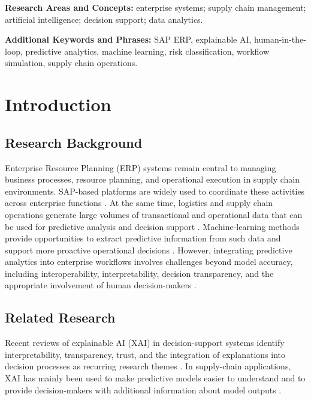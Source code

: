 \documentclass[10pt,a4paper]{article}
\begin{document}
\noindent\textbf{Research Areas and Concepts:}
enterprise systems; supply chain management; artificial intelligence; decision support; data analytics.

\medskip
\noindent\textbf{Additional Keywords and Phrases:}
SAP ERP, explainable AI, human-in-the-loop, predictive analytics, machine learning, risk classification, workflow simulation, supply chain operations.

\medskip

\section{Introduction}

\subsection{Research Background}

Enterprise Resource Planning (ERP) systems remain central to managing business processes, 
resource planning, and operational execution in supply chain environments. 
SAP-based platforms are widely used to coordinate these activities across enterprise 
functions \cite{monk2006sap}.
At the same time, logistics and supply chain operations generate large volumes of 
transactional and operational data that can be used for predictive analysis and 
decision support \cite{constante2019dataco}.
Machine-learning methods provide opportunities to 
extract predictive information from such data and support 
more proactive operational decisions
 \cite{xu2021industry40,olan2024xai_supplychain}.
However, integrating predictive analytics into 
enterprise workflows involves challenges beyond model accuracy, 
including interoperability, interpretability, 
decision transparency, and the appropriate involvement 
of human decision-makers \cite{amershi2019guidelines,li2024xai_supplychain}.

\subsection{Related Research}

Recent reviews of explainable AI (XAI) in decision-support systems
identify interpretability, transparency, trust, and the integration of
explanations into decision processes as recurring research themes
\cite{kostopoulos2024xai_dss,ezeji2024explainable_dss,fanfani2026human_dss}.
In supply-chain applications, XAI has mainly been used to make
predictive models easier to understand and to provide decision-makers
with additional information about model outputs
\cite{olan2024xai_supplychain,kosasih2024xai_supplychain}.
\end{document}

